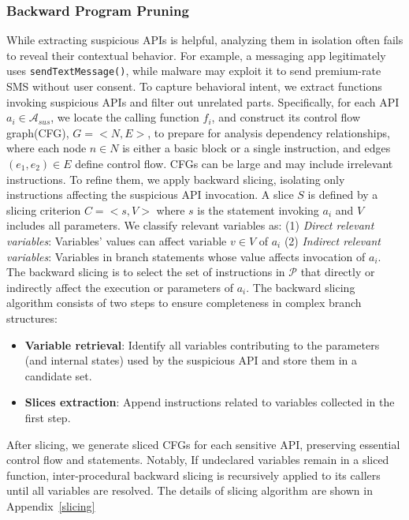 \subsubsection{Backward Program Pruning}
While extracting suspicious APIs is helpful, analyzing them in isolation often fails to reveal their contextual behavior. For example, a messaging app legitimately uses \verb|sendTextMessage()|, while malware may exploit it to send premium-rate SMS without user consent. To capture behavioral intent, we extract functions invoking suspicious APIs and filter out unrelated parts. Specifically, for each API $a_i \in \mathcal{A}_{sus}$, we locate the calling function $f_i$, and construct its control flow graph(CFG), $G = <N, E>$, to prepare for analysis dependency relationships, where each node $n \in N$ is either a basic block or a single instruction, and edges $(e_1, e_2) \in E$ define control flow. CFGs can be large and may include irrelevant instructions. To refine them, we apply backward slicing, isolating only instructions affecting the suspicious API invocation. A slice $S$ is defined by a slicing criterion $C = <s, V>$ where $s$ is the statement invoking $a_i$ and $V$ includes all parameters. We classify relevant variables as: (1) \textit{Direct relevant variables}: Variables' values can affect variable $v \in V$ of $a_i$  (2) \textit{Indirect relevant variables}: Variables in branch statements whose value affects invocation of $a_i$. The backward slicing is to select the set of instructions in $\mathcal{P}$ that directly or indirectly affect the execution or parameters of $a_i$. The backward slicing algorithm consists of two steps to ensure completeness in complex branch structures:
\begin{itemize}
    \item \textbf{Variable retrieval}: Identify all variables contributing to the parameters (and internal states) used by the suspicious API and store them in a candidate set.
    \item \textbf{Slices extraction}: Append instructions related to variables collected in the first step.
\end{itemize}

After slicing, we generate sliced CFGs for each sensitive API, preserving essential control flow and statements. Notably, If undeclared variables remain in a sliced function, inter-procedural backward slicing is recursively applied to its callers until all variables are resolved. The details of slicing algorithm are shown in Appendix~\ref{slicing}

